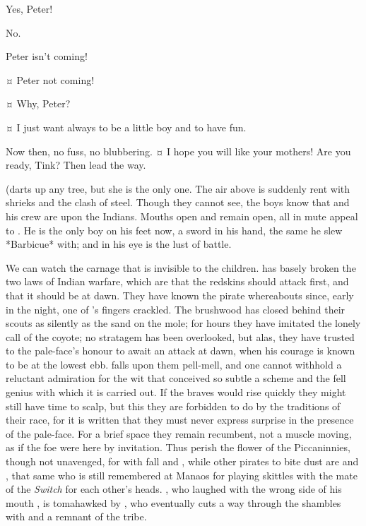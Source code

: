 \begin{drama}
\wendyspeaks
Yes, Peter!

\peterspeaks
No.


\wendyspeaks
Peter isn't coming!


\johnspeaks {}¤
Peter not coming!

\tootlesspeaks {}¤
Why, Peter?

\peterspeaks {}¤
I just want always to be a little boy and to have fun.


\speakercontinues
Now then, no fuss, no blubbering.
¤
I hope you will like your mothers!
Are you ready, Tink?
Then lead the way.

\begin{stagedir}
(\tink darts up any tree, but she is the only one.
The air above is suddenly rent with shrieks and the clash of steel.
Though they cannot see, the boys know that \hook and his crew are upon the Indians.
Mouths open and remain open, all in mute appeal to \peter.
He is the only boy on his feet now, a sword in his hand, the same he slew *Barbicue* with;
and in his eye is the lust of battle.

We can watch the carnage that is invisible to the children.
\hook has basely broken the two laws of Indian warfare,
which are that the redskins should attack first, and that it should be at dawn.
They have known the pirate whereabouts since, early in the night, one of \smee's fingers crackled.
The brushwood has closed behind their scouts as silently as the sand on the mole;
for hours they have imitated the lonely call of the coyote;
no stratagem has been overlooked, but alas, they have trusted to the pale-face's honour to await an attack at dawn,
when his courage is known to be at the lowest ebb.
\hook falls upon them pell-mell,
and one cannot withhold a reluctant admiration for the wit that conceived so subtle a scheme
and the fell genius with which it is carried out.
If the braves would rise quickly they might still have time to scalp,
but this they are forbidden to do by the traditions of their race,
for it is written that they must never express surprise in the presence of the pale-face.
For a brief space they remain recumbent, not a muscle moving, as if the foe were here by invitation.
Thus perish the flower of the Piccaninnies, though not unavenged,
for with  fall  and ,
while other pirates to bite dust are  and ,
that same  who is still remembered at Manaos
for playing skittles with the mate of the \emph{Switch} for each other's heads.
, who laughed with the wrong side of his mouth ,
is tomahawked by \panther,
who eventually cuts a way through the shambles with \tigerlily and a remnant of the tribe.


\end{stagedir}
\end{drama}
